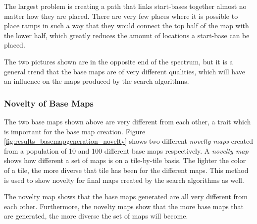 The largest problem is creating a path that links start-bases together almost no matter how they are placed. There are very few places where it is possible to place ramps in such a way that they would connect the top half of the map with the lower half, which greatly reduces the amount of locations a start-base can be placed.

The two pictures shown are in the opposite end of the spectrum, but it is a general trend that the base maps are of very different qualities, which will have an influence on the maps produced by the search algorithms.

\subsubsection{Novelty of Base Maps}

The two base maps shown above are very different from each other, a trait which is important for the base map creation. Figure \ref{fig:results_basemapgeneration_novelty} shows two different \textit{novelty maps} created from a population of 10 and 100 different base maps respectively. A \textit{novelty map} shows how different a set of maps is on a tile-by-tile basis. The lighter the color of a tile, the more diverse that tile has been for the different maps. This method is used to show novelty for final maps created by the search algorithms as well.


The novelty map shows that the base maps generated are all very different from each other. Furthermore, the novelty maps show that the more base maps that are generated, the more diverse the set of maps will become.